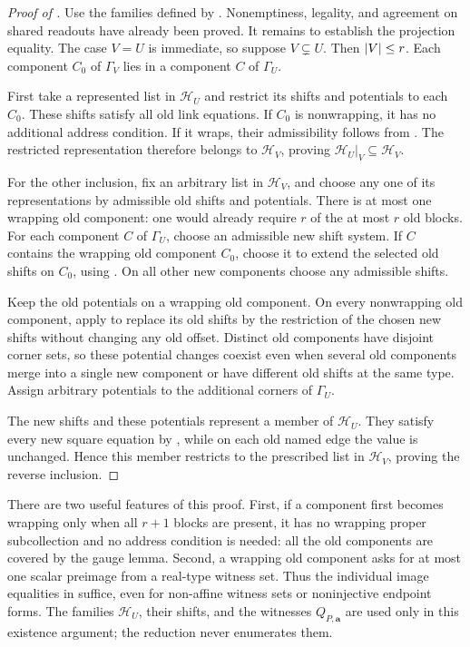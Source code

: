\documentclass[11pt]{article}
\theoremstyle{definition}
\newcommand{\cH}{\mathcal H}
\DeclarePairedDelimiter{\abs}{\lvert}{\rvert}
\begin{document}
\begin{proof}[Proof of ]
Use the families defined by . Nonemptiness,
legality, and agreement on shared readouts have already been proved.
It remains to establish the projection equality. The case \(V=U\)
is immediate, so suppose \(V\subsetneq U\). Then \(\abs{V}\le r\).
Each component \(C_0\) of \(\Gamma_V\) lies in a component \(C\) of
\(\Gamma_U\).

First take a represented list in \(\cH_U\) and restrict its shifts and
potentials to each \(C_0\). These shifts satisfy all old link equations.
If \(C_0\) is nonwrapping, it has no additional address condition.
If it wraps, their admissibility follows from
. The restricted representation therefore
belongs to \(\cH_V\), proving
\(\cH_U|_V\subseteq\cH_V\).

For the other inclusion, fix an arbitrary list in \(\cH_V\), and choose
any one of its representations by admissible old shifts and potentials.
There is at most one wrapping old component: one would already require
\(r\) of the at most \(r\) old blocks.
For each component \(C\) of \(\Gamma_U\), choose an admissible new shift
system. If \(C\) contains the wrapping old component \(C_0\), choose it
to extend the selected old shifts on \(C_0\), using
. On all other new components choose any
admissible shifts.

Keep the old potentials on a wrapping old component. On every
nonwrapping old component, apply  to replace its
old shifts by the restriction of the chosen new shifts without changing
any old offset. Distinct old components have disjoint corner sets,
so these potential changes coexist even when several old components
merge into a single new component or have different old shifts at the
same type. Assign arbitrary potentials to the additional corners of
\(\Gamma_U\).

The new shifts and these potentials represent a member of \(\cH_U\).
They satisfy every new square equation by
, while on each old named edge the value is
unchanged. Hence this member restricts to the prescribed list in
\(\cH_V\), proving the reverse inclusion.
\end{proof}

There are two useful features of this proof. First, if a component
first becomes wrapping only when all \(r+1\) blocks are present, it has
no wrapping proper subcollection and no address condition is needed:
all the old components are covered by the gauge lemma. Second, a
wrapping old component asks for at most one scalar preimage from a
real-type witness set. Thus the individual image equalities in
 suffice, even for non-affine witness sets
or noninjective endpoint forms. The families \(\cH_U\), their shifts,
and the witnesses \(Q_{P,\mathbf a}\) are used only in this existence
argument; the reduction never enumerates them.
\end{document}
